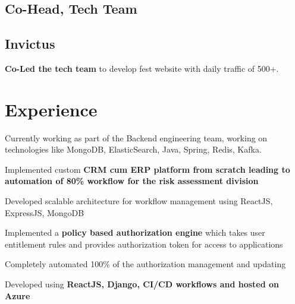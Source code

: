 \documentclass[]{ishaan-kamra-resume}
\begin{document}
\begin{minipage}[t]{0.33\textwidth}
    \subsection{Co-Head, Tech Team}
    \subsection{Invictus}
    \textbullet{} \textbf{Co-Led the tech team} to develop fest website with daily traffic of 500+.
    \sectionsep


\end{minipage}
\hfill
\begin{minipage}[t]{0.66\textwidth}


    \section{Experience}
    \vspace{\topsep} %
    \begin{tightemize}
        \item Currently working as part of the Backend engineering team, working on technologies like MongoDB, ElasticSearch, Java, Spring, Redis, Kafka.
    \end{tightemize}
    \sectionsep

    \begin{tightemize}
        \item Implemented custom \textbf{CRM cum ERP platform from scratch leading to automation of 80\% workflow for the risk assessment division}
        \item Developed scalable architecture for workflow management using ReactJS, ExpressJS, MongoDB
    \end{tightemize}
    \sectionsep

    \begin{tightemize}
        \item Implemented a \textbf{policy based authorization engine} which takes user entitlement rules and provides authorization token for access to applications
        \item Completely automated 100\% of the authorization management and updating
        \item Developed using \textbf{ReactJS, Django, CI/CD workflows and hosted on Azure}
    \end{tightemize}
    \sectionsep


\end{minipage}
\end{document}
